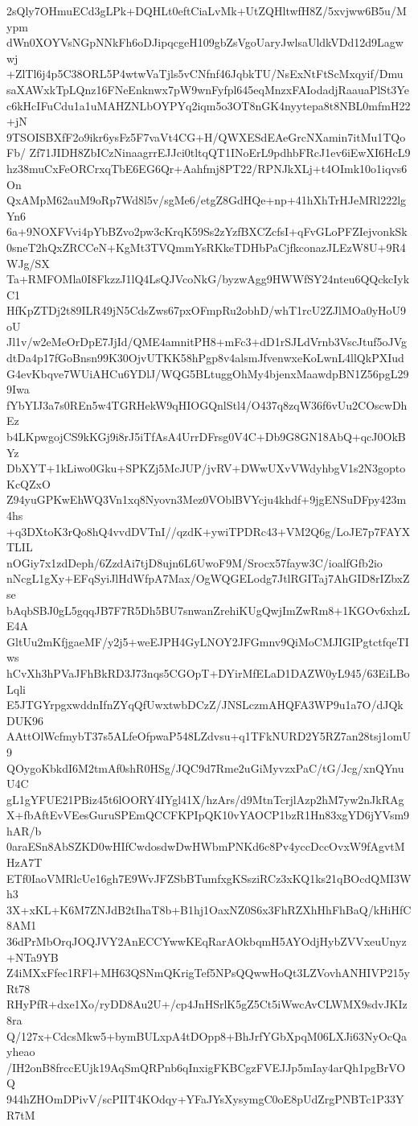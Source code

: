 2sQly7OHmuECd3gLPk+DQHLt0eftCiaLvMk+UtZQHltwfH8Z/5xvjww6B5u/Mypm
dWn0XOYVsNGpNNkFh6oDJipqcgeH109gbZsVgoUaryJwlsaUldkVDd12d9Lagwwj
+ZlTl6j4p5C38ORL5P4wtwVaTjls5vCNfnf46JqbkTU/NsExNtFtScMxqyif/Dmu
saXAWxkTpLQnz16FNeEnknwx7pW9wnFyfpl645eqMnzxFAIodadjRaauaPlSt3Ye
c6kHcIFuCdu1a1uMAHZNLbOYPYq2iqm5o3OT8nGK4nyytepa8t8NBL0mfmH22+jN
9TSOISBXfF2o9ikr6ysFz5F7vaVt4CG+H/QWXESdEAeGrcNXamin7itMu1TQoFb/
Zf71JIDH8ZbICzNinaagrrEJJci0tltqQT1INoErL9pdhbFRcJ1ev6iEwXI6HcL9
hz38muCxFeORCrxqTbE6EG6Qr+Aahfmj8PT22/RPNJkXLj+t4OImk10o1iqvs6On
QxAMpM62auM9oRp7Wd8l5v/sgMe6/etgZ8GdHQe+np+41hXhTrHJeMRl222lgYn6
6a+9NOXFVvi4pYbBZvo2pw3cKrqK59Ss2zYzfBXCZcfsI+qFvGLoPFZIejvonkSk
0sneT2hQxZRCCeN+KgMt3TVQmmYsRKkeTDHbPaCjfkconazJLEzW8U+9R4WJg/SX
Ta+RMFOMla0I8FkzzJ1lQ4LsQJVcoNkG/byzwAgg9HWWfSY24nteu6QQckcIykC1
HfKpZTDj2t89ILR49jN5CdsZws67pxOFmpRu2obhD/whT1rcU2ZJlMOa0yHoU9oU
Jl1v/w2eMeOrDpE7JjId/QME4amnitPH8+mFc3+dD1rSJLdVrnb3VscJtuf5oJVg
dtDa4p17fGoBnsn99K30OjvUTKK58hPgp8v4alsmJfvenwxeKoLwnL4llQkPXIud
G4evKbqve7WUiAHCu6YDlJ/WQG5BLtuggOhMy4bjenxMaawdpBN1Z56pgL299Iwa
fYbYIJ3a7s0REn5w4TGRHekW9qHIOGQnlStl4/O437q8zqW36f6vUu2COscwDhEz
b4LKpwgojCS9kKGj9i8rJ5iTfAsA4UrrDFrsg0V4C+Db9G8GN18AbQ+qcJ0OkBYz
DbXYT+1kLiwo0Gku+SPKZj5McJUP/jvRV+DWwUXvVWdyhbgV1s2N3goptoKcQZxO
Z94yuGPKwEhWQ3Vn1xq8Nyovn3Mez0VOblBVYcju4khdf+9jgENSuDFpy423m4hs
+q3DXtoK3rQo8hQ4vvdDVTnI//qzdK+ywiTPDRc43+VM2Q6g/LoJE7p7FAYXTLIL
nOGiy7x1zdDeph/6ZzdAi7tjD8ujn6L6UwoF9M/Srocx57fayw3C/ioalfGfb2io
nNcgL1gXy+EFqSyiJlHdWfpA7Max/OgWQGELodg7JtlRGITaj7AhGID8rIZbxZse
bAqbSBJ0gL5gqqJB7F7R5Dh5BU7snwanZrehiKUgQwjImZwRm8+1KGOv6xhzLE4A
GltUu2mKfjgaeMF/y2j5+weEJPH4GyLNOY2JFGmnv9QiMoCMJIGIPgtctfqeTIws
hCvXh3hPVaJFhBkRD3J73nqs5CGOpT+DYirMfELaD1DAZW0yL945/63EiLBoLqli
E5JTGYrpgxwddnIfnZYqQfUwxtwbDCzZ/JNSLczmAHQFA3WP9u1a7O/dJQkDUK96
AAttOlWcfmybT37s5ALfeOfpwaP548LZdvsu+q1TFkNURD2Y5RZ7an28tsj1omU9
QOygoKbkdI6M2tmAf0shR0HSg/JQC9d7Rme2uGiMyvzxPaC/tG/Jcg/xnQYnuU4C
gL1gYFUE21PBiz45t6lOORY4IYgl41X/hzArs/d9MtnTcrjlAzp2hM7yw2nJkRAg
X+fbAftEvVEesGuruSPEmQCCFKPIpQK10vYAOCP1bzR1Hn83xgYD6jYVsm9hAR/b
0araESn8AbSZKD0wHIfCwdosdwDwHWbmPNKd6c8Pv4yccDccOvxW9fAgvtMHzA7T
ETf0IaoVMRlcUe16gh7E9WvJFZSbBTumfxgKSsziRCz3xKQ1ks21qBOcdQMI3Wh3
3X+xKL+K6M7ZNJdB2tIhaT8b+B1hj1OaxNZ0S6x3FhRZXhHhFhBaQ/kHiHfC8AM1
36dPrMbOrqJOQJVY2AnECCYwwKEqRarAOkbqmH5AYOdjHybZVVxeuUnyz+NTa9YB
Z4iMXxFfec1RFl+MH63QSNmQKrigTef5NPsQQwwHoQt3LZVovhANHIVP215yRt78
RHyPfR+dxe1Xo/ryDD8Au2U+/cp4JnHSrlK5gZ5Ct5iWwcAvCLWMX9sdvJKIz8ra
Q/127x+CdcsMkw5+bymBULxpA4tDOpp8+BhJrfYGbXpqM06LXJi63NyOcQayheao
/IH2onB8frccEUjk19AqSmQRPnb6qInxigFKBCgzFVEJJp5mIay4arQh1pgBrVOQ
944hZHOmDPivV/scPIIT4KOdqy+YFaJYsXysymgC0oE8pUdZrgPNBTc1P33YR7tM
